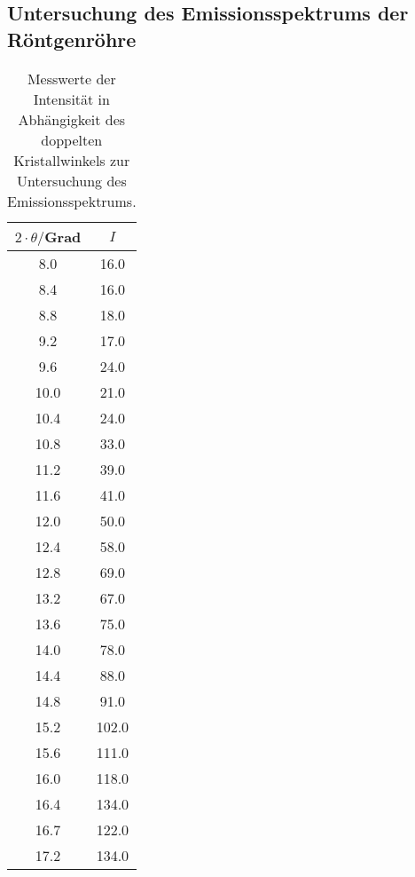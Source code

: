 \subsection{Untersuchung des Emissionsspektrums der Röntgenröhre}
\label{subsec:emission}

\begin{table}[htp]
        \begin{center}
          \caption{Messwerte der Intensität in Abhängigkeit des doppelten Kristallwinkels zur Untersuchung des Emissionsspektrums.}
          \label{tab:bragg}
                \begin{tabular}{cc}
                \toprule
                        {$2 \cdot \theta/$Grad} & {$I$}\\
                        \midrule
                        8.0 & 16.0\\
                        8.4 & 16.0\\
                        8.8 & 18.0\\
                        9.2 & 17.0\\
                        9.6 & 24.0\\
                        10.0 & 21.0\\
                        10.4 & 24.0\\
                        10.8 & 33.0\\
                        11.2 & 39.0\\
                        11.6 & 41.0\\
                        12.0 & 50.0\\
                        12.4 & 58.0\\
                        12.8 & 69.0\\
                        13.2 & 67.0\\
                        13.6 & 75.0\\
                        14.0 & 78.0\\
                        14.4 & 88.0\\
                        14.8 & 91.0\\
                        15.2 & 102.0\\
                        15.6 & 111.0\\
                        16.0 & 118.0\\
                        16.4 & 134.0\\
                        16.7 & 122.0\\
                        17.2 & 134.0\\

\end{tabular}
\end{center}
\end{table}
